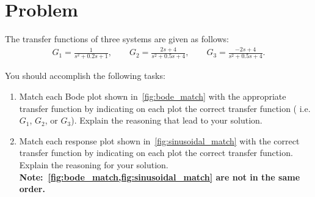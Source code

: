 \documentclass[11pt, reqno]{article}    %
\begin{document}
\section{Problem}\label{prob:tf_match}

The transfer functions of three systems are given as follows:
\begin{align*}
    G_1 = \frac{1}{s^2 + 0.2 s+ 1}, \qquad G_2 = \frac{2s +4}{s^2 + 0.5 s + 4}, \qquad G_3 = \frac{-2s + 4}{s^2 + 0.5 s +4}.
\end{align*}

You should accomplish the following tasks:
\begin{enumerate}
    \item Match each Bode plot shown in~\cref{fig:bode_match}  with the appropriate transfer function by indicating on each plot the correct transfer function ( i.e. \(G_1\), \(G_2\), or \(G_3\)).
        Explain the reasoning that lead to your solution.
    \item Match each response plot shown in~\cref{fig:sinusoidal_match} with the correct transfer function by indicating on each plot the correct transfer function. 
        Explain the reasoning for your solution.
        \textbf{Note:~\cref{fig:bode_match,fig:sinusoidal_match} are not in the same order.}
\end{enumerate}
\end{document}
